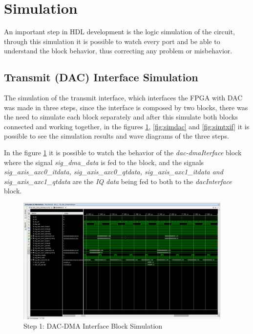 \vfill
\clearpage

\section{Simulation}

An important step in HDL development is the logic simulation of the circuit,
through this simulation it is possible to watch every port and be able to
understand the block behavior, thus correcting any problem or misbehavior.

\subsection{Transmit (DAC) Interface Simulation}

The simulation of the transmit interface, which interfaces the FPGA with DAC was
made in three steps, since the interface is composed by two blocks, there was
the need to simulate each block separately and after this simulate both blocks
connected and working together, in the figures \ref{fig:simdacdma},
\ref{fig:simdac} and \ref{fig:simtxif} it is possible to see the simulation
results and wave diagrams of the three steps.

In the figure \ref{fig:simdacdma} it is possible to watch the behavior of the
\textit{dac-dmaIterface} block where the signal \textit{sig\_dma\_data} is fed to
the block, and the signals \textit{ sig\_axis\_axc0\_itdata, sig\_axis\_axc0\_qtdata,
sig\_axis\_axc1\_itdata and sig\_axis\_axc1\_qtdata} are the \textit{IQ data} being
fed to both to the \textit{dacInterface} block.

\begin{figure}[htbp]
    \centering
    \includegraphics[width=0.95\textwidth]{./figures/dac_dmaInterface}
    \caption{ Step 1: DAC-DMA Interface Block Simulation
    \label{fig:simdacdma}}
\end{figure}

